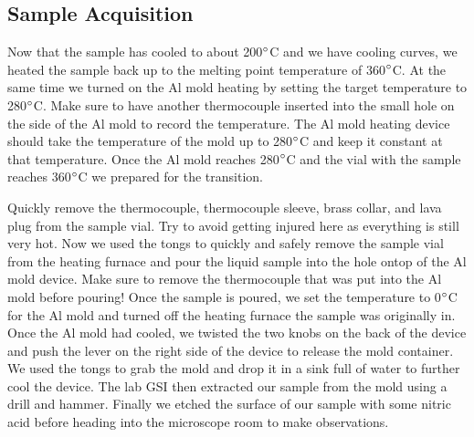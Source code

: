 \documentclass{article}
\begin{document}
\subsection{Sample Acquisition}
Now that the sample has cooled to about 200$\degree$C and we have cooling curves, we heated the sample back up to the melting point temperature of 360$\degree$C. At the same time we turned on the Al mold heating by setting the target temperature to 280$\degree$C. Make sure to have another thermocouple inserted into the small hole on the side of the Al mold to record the temperature. The Al mold heating device should take the temperature of the mold up to 280$\degree$C and keep it constant at that temperature. Once the Al mold reaches 280$\degree$C and the vial with the sample reaches 360$\degree$C we prepared for the transition. 

Quickly remove the thermocouple, thermocouple sleeve, brass collar, and lava plug from the sample vial. Try to avoid getting injured here as everything is still very hot. Now we used the tongs to quickly and safely remove the sample vial from the heating furnace and pour the liquid sample into the hole ontop of the Al mold device. Make sure to remove the thermocouple that was put into the Al mold before pouring! Once the sample is poured, we set the temperature to 0$\degree$C for the Al mold and turned off the heating furnace the sample was originally in. Once the Al mold had cooled, we twisted the two knobs on the back of the device and push the lever on the right side of the device to release the mold container. We used the tongs to grab the mold and drop it in a sink full of water to further cool the device. The lab GSI then extracted our sample from the mold using a drill and hammer. Finally we etched the surface of our sample with some nitric acid before heading into the microscope room to make observations.

\end{document}
